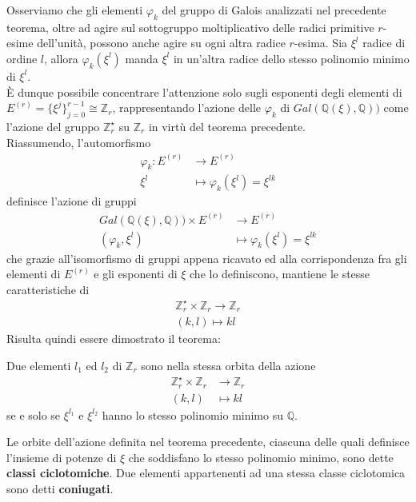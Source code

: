 Osserviamo che gli elementi $\varphi_{k}$ del gruppo di Galois analizzati nel precedente teorema, oltre ad agire sul sottogruppo moltiplicativo delle radici primitive $r$-esime dell'unità, possono anche agire su ogni altra radice $r$-esima. Sia $\xi^{l}$ radice di ordine $l$, allora $\varphi_{k}(\xi^{l})$ manda $\xi^{l}$ in un'altra radice dello stesso polinomio minimo di $\xi^{l}$.\\
È dunque possibile concentrare l'attenzione solo sugli esponenti degli elementi di $E^{(r)} = \lbrace \xi^{j}\rbrace_{j=0}^{r-1} \cong \mathbb{Z}_{r}$, rappresentando l'azione delle $\varphi_{k}$ di $Gal(\mathbb{Q}(\xi), \mathbb{Q}))$ come l'azione del gruppo $\mathbb{Z}_{r}^{\star}$ su $\mathbb{Z}_{r}$ in virtù del teorema precedente.\\
Riassumendo, l'automorfismo
\begin{align*}
\varphi_{k}: E^{(r)}  &\longrightarrow  E^{(r)}   \\
               \xi^{l} &\longmapsto \varphi_{k}(\xi^{l}) = \xi^{lk}
\end{align*}
definisce l'azione di gruppi
\begin{align*}
 Gal(\mathbb{Q}(\xi), \mathbb{Q})) \times E^{(r)}  &\longrightarrow  E^{(r)}   \\
           (\varphi_{k},\xi^{l}) &\longmapsto \varphi_{k}(\xi^{l}) = \xi^{lk}
\end{align*}
che grazie all'isomorfismo di gruppi appena ricavato ed alla corrispondenza fra gli elementi di $E^{(r)}$ e gli esponenti di $\xi$ che lo definiscono, mantiene le stesse caratteristiche di 
\begin{align*}
 \mathbb{Z}_{r}^{\star} \times \mathbb{Z}_{r} \longrightarrow  \mathbb{Z}_{r}   \\
           (k,l) \longmapsto kl
\end{align*}
Risulta quindi essere dimostrato il teorema:
\begin{teorema} \label{teo:iffPoliMinimoQ}
Due elementi $l_{1}$ ed $l_{2}$ di $\mathbb{Z}_{r}$ sono nella stessa orbita della azione 
\begin{align*}
 \mathbb{Z}_{r}^{\star} \times \mathbb{Z}_{r} &\longrightarrow  \mathbb{Z}_{r}   \\
           (k,l) &\longmapsto kl
\end{align*}
se e solo se $\xi^{l_{1}}$ e $\xi^{l_{2}}$ hanno lo stesso polinomio minimo su $\mathbb{Q}$.
\end{teorema}

\begin{definizione}\label{cap2:orbiteq}
   Le orbite dell'azione definita nel teorema precedente, ciascuna delle quali definisce l'insieme di potenze di $\xi$ che soddisfano lo stesso polinomio minimo, sono dette {\bf classi ciclotomiche}. Due elementi appartenenti ad una stessa classe ciclotomica sono detti {\bf coniugati}. 
\end{definizione}

